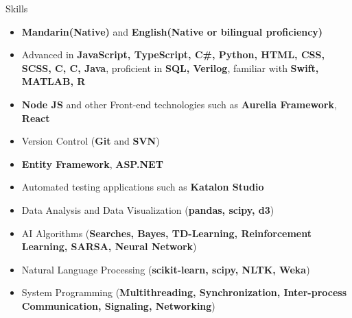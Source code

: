 \documentclass{resume}
\begin{document}
\begin{rSection}{Skills}

\begin{itemize}

    \item   \textbf{Mandarin(Native)} and \textbf{English(Native or bilingual proficiency)}
    \item	Advanced in \textbf{JavaScript, TypeScript, C\#, Python, HTML, CSS, SCSS, C, C\boldsymbol{++}, Java}, proficient in \textbf{SQL, Verilog}, familiar with \textbf{Swift, MATLAB, R}
    \item	\textbf{Node JS} and other Front-end technologies such as \textbf{Aurelia Framework}, \textbf{React}
    \item   Version Control (\textbf{Git} and \textbf{SVN})
    \item	\textbf{Entity Framework}, \textbf{ASP.NET}
    \item	Automated testing applications such as \textbf{Katalon Studio}	
    \item   Data Analysis and Data Visualization (\textbf{pandas, scipy, d3})
    \item	AI Algorithms (\textbf{Searches, Bayes, TD-Learning, Reinforcement Learning, SARSA, Neural Network})
    \item	Natural Language Processing (\textbf{scikit-learn, scipy, NLTK, Weka})
    \item	System Programming (\textbf{Multithreading, Synchronization, Inter-process Communication, Signaling, Networking})

\end{itemize}

\end{rSection}
\end{document}
